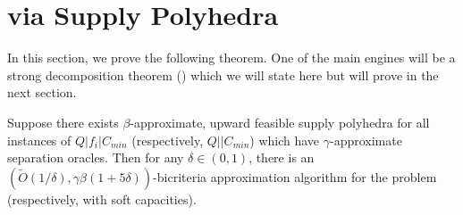 \section{\mckc via Supply Polyhedra}\label{sec:o1}
\def\yy{y^\calT}
In this section, we prove the following theorem. One of the main engines will be a strong decomposition theorem () which we will state here but will prove in the next section.
\begin{theorem}\label{thm:reduction}
Suppose there exists $\beta$-approximate, upward feasible supply polyhedra  for all instances of $Q|f_i|C_{min}$ (respectively, $Q||C_{min}$) which have $\gamma$-approximate separation oracles.
Then for any $\delta\in(0,1)$, there is an $\left(\tilde{O}(1/\delta),\gamma\beta(1+5\delta)\right)$-bicriteria approximation algorithm for the \mckc problem (respectively, with soft capacities).
\end{theorem}
\noindent
	
